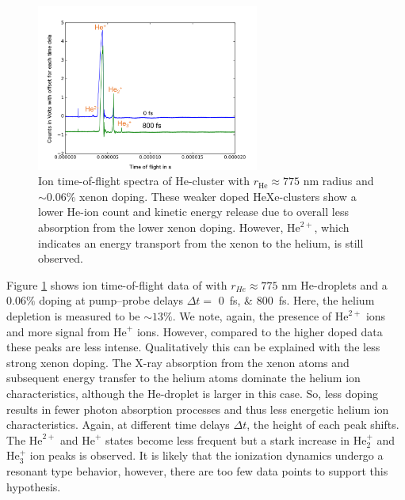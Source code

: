 \begin{figure}
 	\centering
 		\includegraphics[width=0.65\textwidth]{images/results/TOF-helium-xenon-cluster-13.png}
 	\caption[TOF spectra of HeXe-clusters with $\sim 0.06\%$ Xe-doping at various delays $\Delta t$.]{Ion time-of-flight spectra of He-cluster with $r_{\text{He}}\approx 775$ nm radius and $\sim 0.06\%$ xenon doping. These weaker doped HeXe-clusters show a lower He-ion count and kinetic energy release due to overall less absorption from the lower xenon doping. However, $\text{He}^{2+}$, which indicates an energy transport from the xenon to the helium, is still observed.}
 	\label{fig:TOF-helium-xenon-cluster-13}
\end{figure}
Figure \ref{fig:TOF-helium-xenon-cluster-13} shows ion time-of-flight data of with $r_{He}\approx 775$ nm He-droplets and a $0.06 \%$ doping at pump--probe delays $\Delta t=$ \SIlist{0;800}{\femto\second}. Here, the helium depletion is measured to be $\sim 13\%$. We note, again, the presence of $\text{He}^{2+}$ ions and more signal from $\text{He}^{+}$ ions. However, compared to the higher doped data these peaks are less intense. Qualitatively this can be explained with the less strong xenon doping. The X-ray absorption from the xenon atoms and subsequent energy transfer to the helium atoms dominate the helium ion characteristics, although the He-droplet is larger in this case. So, less doping results in fewer photon absorption processes and thus less energetic helium ion characteristics. Again, at different time delays $\Delta t$, the height of each peak shifts. The $\text{He}^{2+}$ and $\text{He}^{+}$ states become less frequent but a stark increase in $\text{He}_{2}^{+}$ and $\text{He}_{3}^{+}$ ion peaks is observed. It is likely that the ionization dynamics undergo a resonant type behavior, however, there are too few data points to support this hypothesis.\\[1\baselineskip]
%

